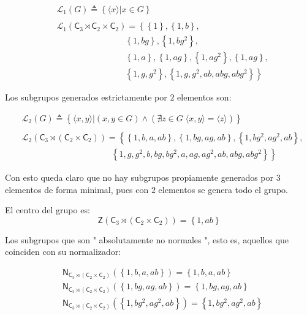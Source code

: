 \documentclass[12pt,a4paper,fleqn,spanish,final,openright]{extbook}
\theoremstyle{definition}
\theoremstyle{remark}
\begin{document}
\begin{align*}
&{\mathcal{L}_{1}}{\left({G}\right)}\triangleq{\left\lbrace{\langle x \rangle\vert x\in G}\right\rbrace}\\
&\\ 
&{\mathcal{L}_{1}}{\left({{\mathsf{C}_{3}}\rtimes{\mathsf{C}_{2}\times\mathsf{C}_{2}}}\right)} = {\left\lbrace\right.}
{\left\lbrace{1}\right\rbrace},{\left\lbrace{1,b}\right\rbrace},\\
&\qquad\qquad\qquad\qquad{\left\lbrace{1,bg}\right\rbrace},
{\left\lbrace{1,bg^2}\right\rbrace},\\
&\qquad\qquad\qquad\qquad{\left\lbrace{1,a}\right\rbrace},
{\left\lbrace{1,ag}\right\rbrace},
{\left\lbrace{1,ag^2}\right\rbrace},
{\left\lbrace{1,ag}\right\rbrace},\\
&\qquad\qquad\qquad\qquad{\left\lbrace{1,g,g^2}\right\rbrace},
{\left\lbrace{1,g,g^2,ab,abg,abg^2}\right\rbrace}{\left.\right\rbrace}
\end{align*}

Los subgrupos generados estrictamente por $2$ elementos son:

\begin{align*}
&{\mathcal{L}_{2}}{\left({G}\right)}\triangleq
{\left\lbrace{
\langle x,y \rangle
\vert 
(x,y\in G) \wedge (\nexists z \in G \;\langle x,y \rangle = \langle z\rangle)
}\right\rbrace}\\
&\\
&{\mathcal{L}_{2}}{\left({{\mathsf{C}_3}\rtimes{({\mathsf{C}_{2}}\times{\mathsf{C}_{2}})}}\right)}=\left\lbrace\right.
{\left\lbrace{1,b,a,ab}\right\rbrace},
{\left\lbrace{1,bg,ag,ab}\right\rbrace},
{\left\lbrace{1,bg^2,ag^2,ab}\right\rbrace},\\
&\qquad\qquad\qquad\qquad\qquad\;\,{\left\lbrace{1,g,g^2,b,bg,bg^2,a,ag,ag^2,ab,abg,abg^2}\right\rbrace}
\left.\right\rbrace
\end{align*}

Con esto queda claro que no hay subgrupos propiamente generados por $3$ elementos de forma minimal, pues con $2$ elementos se genera todo el grupo.

El centro del grupo es: 
\[
\mathsf{Z}\left({{\mathsf{C}_{3}}\rtimes({\mathsf{C}_{2}}\times{\mathsf{C}_{2}})}\right) = {\left\lbrace{1,ab}\right\rbrace}
\]


Los subgrupos que son " absolutamente no normales ", esto es, aquellos que coinciden con su normalizador:


\begin{align*}
&
\mathsf{N}_{{\mathsf{C}_{3}}\rtimes({\mathsf{C}_{2}}\times{\mathsf{C}_{2}})}
\left(
{\left\lbrace
{1,b,a,ab}
\right\rbrace}
\right) = 
{\left\lbrace
{1,b,a,ab}
\right\rbrace}\\
&
\mathsf{N}_{{\mathsf{C}_{3}}\rtimes({\mathsf{C}_{2}}\times{\mathsf{C}_{2}})}
\left(
{\left\lbrace
{1,bg,ag,ab}
\right\rbrace}
\right) = 
{\left\lbrace
{1,bg,ag,ab}
\right\rbrace}\\
&
\mathsf{N}_{{\mathsf{C}_{3}}\rtimes({\mathsf{C}_{2}}\times{\mathsf{C}_{2}})}
\left(
{\left\lbrace
{1,bg^2,ag^2,ab}
\right\rbrace}
\right) = 
{\left\lbrace
{1,bg^2,ag^2,ab}
\right\rbrace}
\end{align*}
\end{document}
